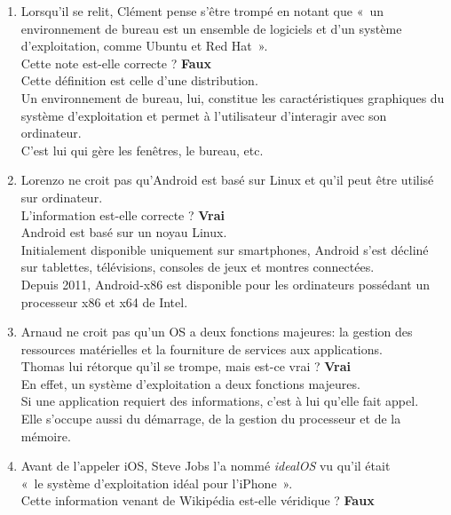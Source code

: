 \begin{enumerate}
  \clearpage

  \item Lorsqu’il se relit, Clément pense s’être trompé en notant que « un
  environnement de bureau est un ensemble de logiciels et d’un système
  d’exploitation, comme Ubuntu et Red Hat ». \\
  Cette note est-elle correcte ? \textbf{Faux} \\

  Cette définition est celle d'une distribution. \\
  Un environnement de bureau, lui, constitue les caractéristiques graphiques
  du système d’exploitation et permet à l’utilisateur d’interagir avec son
  ordinateur. \\
  C'est lui qui gère les fenêtres, le bureau, etc. \\

  \item Lorenzo ne croit pas qu’Android est basé sur Linux et qu’il peut être
  utilisé sur ordinateur. \\
  L’information est-elle correcte ? \textbf{Vrai} \\

  Android est basé sur un noyau Linux. \\
  Initialement disponible uniquement sur smartphones, Android s'est décliné sur
  tablettes, télévisions, consoles de jeux et montres connectées. \\
  Depuis 2011, Android-x86 est disponible pour les ordinateurs possédant un
  processeur x86 et x64 de Intel. \\

  \item Arnaud ne croit pas qu’un OS a deux fonctions majeures: la gestion des
  ressources matérielles et la fourniture de services aux applications. \\
  Thomas lui rétorque qu’il se trompe, mais est-ce vrai ? \textbf{Vrai} \\

  En effet, un système d'exploitation a deux fonctions majeures. \\
  Si une application requiert des informations, c'est à lui qu'elle fait appel. \\
  Elle s'occupe aussi du démarrage, de la gestion du processeur et de la
  mémoire. \\

  \item Avant de l’appeler iOS, Steve Jobs l’a nommé \textit{idealOS} vu qu’il était \\
  « le système d’exploitation idéal pour l’iPhone ». \\
  Cette information venant de Wikipédia est-elle véridique ? \textbf{Faux} \\


\end{enumerate}
